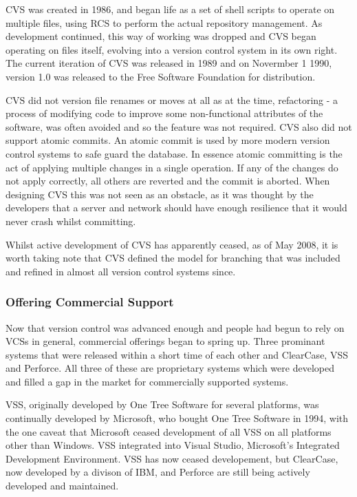 CVS was created in 1986, and began life as a set of shell scripts to operate on multiple files, using RCS to perform the actual repository management.  As development continued, this way of working was dropped and CVS began operating on files itself, evolving into a version control system in its own right.  The current iteration of CVS was released in 1989 and on Novermber 1 1990, version 1.0 was released to the Free Software Foundation for distribution.

CVS did not version file renames or moves at all as at the time, refactoring - a process of modifying code to improve some non-functional attributes of the software, was often avoided and so the feature was not required.  CVS also did not support atomic commits.  An atomic commit is used by more modern version control systems to safe guard the database.  In essence atomic committing is the act of applying multiple changes in a single operation.  If any of the changes do not apply correctly, all others are reverted and the commit is aborted.  When designing CVS this was not seen as an obstacle, as it was thought by the developers that a server and network should have enough resilience that it would never crash whilst committing.

Whilst active development of CVS has apparently ceased, as of May 2008, it is worth taking note that CVS defined the model for branching that was included and refined in almost all version control systems since.  

\subsubsection{Offering Commercial Support}
Now that version control was advanced enough and people had begun to rely on VCSs in general, commercial offerings began to spring up.  Three prominant systems that were released within a short time of each other and ClearCase, VSS and Perforce.  All three of these are proprietary systems which were developed and filled a gap in the market for commercially supported systems.  

VSS, originally developed by One Tree Software for several platforms, was continually developed by Microsoft, who bought One Tree Software in 1994, with the one caveat that Microsoft ceased development of all VSS on all platforms other than Windows.  VSS integrated into Visual Studio, Microsoft's Integrated Development Environment.  VSS has now ceased developement, but ClearCase, now developed by a divison of IBM, and Perforce are still being actively developed and maintained.

